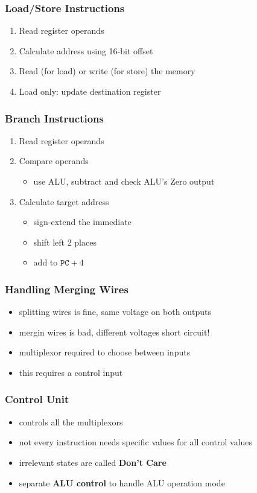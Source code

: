 \documentclass{article}
\begin{document}
\subsubsection{Load/Store Instructions}
\begin{enumerate}
	\item Read register operands
	\item Calculate address using 16-bit offset
	\item Read (for load) or write (for store) the memory
	\item Load only: update destination register
\end{enumerate}
\subsubsection{Branch Instructions}
\begin{enumerate}
	\item Read register operands
	\item Compare operands \begin{itemize}
		\item use ALU, subtract and check ALU's Zero output 
	\end{itemize}
	\item Calculate target address \begin{itemize}
		\item sign-extend the immediate
		\item shift left 2 places
		\item add to $\texttt{PC}+4$
	\end{itemize}
\end{enumerate}
\subsubsection{Handling Merging Wires}
\begin{itemize}
	\item splitting wires is fine, same voltage on both outputs
	\item mergin wires is bad, different voltages \Rightarrow short circuit!
	\item multiplexor required to choose between inputs
	\item this requires a control input
\end{itemize}
\subsubsection{Control Unit}
\begin{itemize}
	\item controls all the multiplexors
	\item not every instruction needs specific values for all control values
	\item irrelevant states are called \textbf{Don't Care}
	\item separate \textbf{ALU control} to handle ALU operation mode
\end{itemize}
\end{document}
